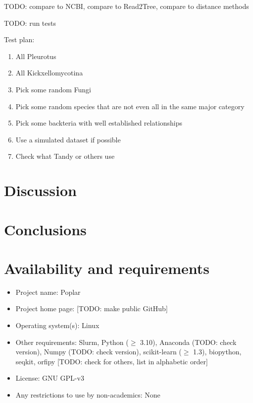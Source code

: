 \documentclass[manuscript,screen,review,nonacm]{acmart}
\begin{document}
TODO: compare to NCBI, compare to Read2Tree, compare to distance methods

TODO: run tests

Test plan:

\begin{enumerate}
    \item All Pleurotus
    \item All Kickxellomycotina
    \item Pick some random Fungi
    \item Pick some random species that are not even all in the same major category
    \item Pick some backteria with well established relationships
    \item Use a simulated dataset if possible
    \item Check what Tandy or others use
\end{enumerate}

\section{Discussion}

\section{Conclusions}

\section{Availability and requirements}

\begin{itemize}
    \item Project name: Poplar
    \item Project home page: [TODO: make public GitHub]
    \item Operating system(s): Linux
    \item Other requirements: Slurm, Python ($\geq$ 3.10), Anaconda (TODO: check version), Numpy (TODO: check version), scikit-learn ($\geq$ 1.3), biopython, seqkit, orfipy [TODO: check for others, list in alphabetic order]
    \item License: GNU GPL-v3
    \item Any restrictions to use by non-academics: None
\end{itemize}




\end{document}
